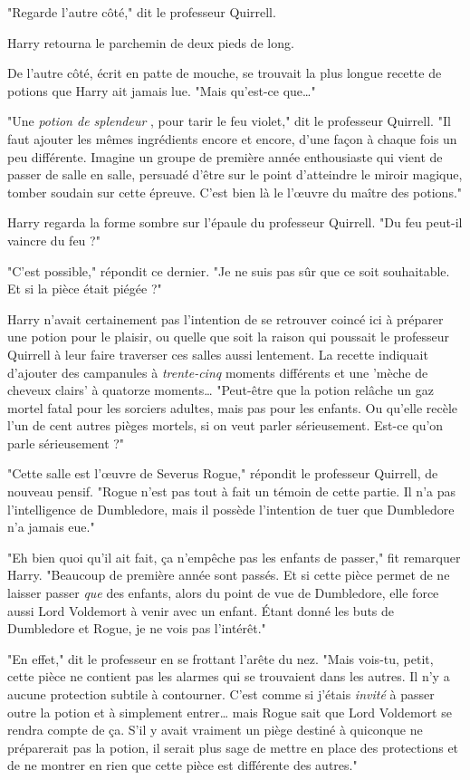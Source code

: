 "Regarde l'autre côté," dit le professeur Quirrell.

Harry retourna le parchemin de deux pieds de long.

De l'autre côté, écrit en patte de mouche, se trouvait la plus longue recette de potions que Harry ait jamais lue. "Mais qu'est-ce que…"

"Une \emph{potion de splendeur} , pour tarir le feu violet," dit le professeur Quirrell. "Il faut ajouter les mêmes ingrédients encore et encore, d'une façon à chaque fois un peu différente. Imagine un groupe de première année enthousiaste qui vient de passer de salle en salle, persuadé d'être sur le point d'atteindre le miroir magique, tomber soudain sur cette épreuve. C'est bien là le l'œuvre du maître des potions."

Harry regarda la forme sombre sur l'épaule du professeur Quirrell. "Du feu peut-il vaincre du feu ?"

"C'est possible," répondit ce dernier. "Je ne suis pas sûr que ce soit souhaitable. Et si la pièce était piégée ?"

Harry n'avait certainement pas l'intention de se retrouver coincé ici à préparer une potion pour le plaisir, ou quelle que soit la raison qui poussait le professeur Quirrell à leur faire traverser ces salles aussi lentement. La recette indiquait d'ajouter des campanules à \emph{trente-cinq}  moments différents et une 'mèche de cheveux clairs' à quatorze moments… "Peut-être que la potion relâche un gaz mortel fatal pour les sorciers adultes, mais pas pour les enfants. Ou qu'elle recèle l'un de cent autres pièges mortels, si on veut parler sérieusement. Est-ce qu'on parle sérieusement ?"

"Cette salle est l'œuvre de Severus Rogue," répondit le professeur Quirrell, de nouveau pensif. "Rogue n'est pas tout à fait un témoin de cette partie. Il n'a pas l'intelligence de Dumbledore, mais il possède l'intention de tuer que Dumbledore n'a jamais eue."

"Eh bien quoi qu'il ait fait, ça n'empêche pas les enfants de passer," fit remarquer Harry. "Beaucoup de première année sont passés. Et si cette pièce permet de ne laisser passer \emph{que}  des enfants, alors du point de vue de Dumbledore, elle force aussi Lord Voldemort à venir avec un enfant. Étant donné les buts de Dumbledore et Rogue, je ne vois pas l'intérêt."

"En effet," dit le professeur en se frottant l'arête du nez. "Mais vois-tu, petit, cette pièce ne contient pas les alarmes qui se trouvaient dans les autres. Il n'y a aucune protection subtile à contourner. C'est comme si j'étais \emph{invité}  à passer outre la potion et à simplement entrer… mais Rogue sait que Lord Voldemort se rendra compte de ça. S'il y avait vraiment un piège destiné à quiconque ne préparerait pas la potion, il serait plus sage de mettre en place des protections et de ne montrer en rien que cette pièce est différente des autres."

